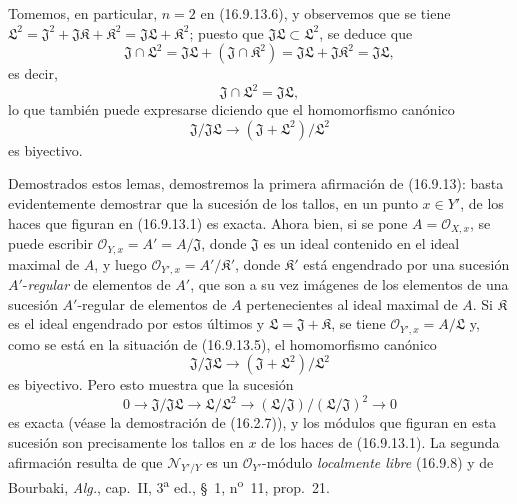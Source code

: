 Tomemos, en particular, $n=2$ en (16.9.13.6), y observemos que se tiene
$\mathfrak{L}^2=\mathfrak J^2+\mathfrak J\mathfrak{K}+\mathfrak{K}^2
=\mathfrak J\mathfrak{L}+\mathfrak{K}^2$; puesto que
$\mathfrak J\mathfrak{L}\subset\mathfrak{L}^2$, se deduce que
\[
  \mathfrak J\cap\mathfrak{L}^2
  =\mathfrak J\mathfrak{L}+(\mathfrak J\cap\mathfrak{K}^2)
  =\mathfrak J\mathfrak{L}+\mathfrak J\mathfrak{K}^2
  =\mathfrak J\mathfrak{L},
\]
es decir,
\[
  \mathfrak J\cap\mathfrak{L}^2=\mathfrak J\mathfrak{L},
  \tag{16.9.13.7}
  \label{IV.16.9.13.7}
\]
lo que también puede expresarse diciendo que el homomorfismo canónico
\[
  \mathfrak J/\mathfrak J\mathfrak{L}
  \longrightarrow(\mathfrak J+\mathfrak{L}^2)/\mathfrak{L}^2
\]
es biyectivo.

Demostrados estos lemas, demostremos la primera afirmación de (16.9.13): basta
evidentemente demostrar que la sucesión de los tallos, en un punto $x\in Y'$,
de los haces que figuran en (16.9.13.1) es exacta. Ahora bien, si se pone
$A=\mathcal{O}_{X,x}$, se puede escribir
$\mathcal{O}_{Y,x}=A'=A/\mathfrak J$, donde $\mathfrak J$ es un ideal
contenido en el ideal maximal de $A$, y luego
$\mathcal{O}_{Y',x}=A'/\mathfrak{K}'$, donde $\mathfrak{K}'$ está engendrado
por una sucesión $A'$-\emph{regular} de elementos de $A'$, que son a su vez imágenes
de los elementos de una sucesión $A'$-regular de elementos de $A$
pertenecientes al ideal maximal de $A$. Si $\mathfrak{K}$ es el ideal
engendrado por estos últimos y $\mathfrak{L}=\mathfrak J+\mathfrak{K}$, se
tiene $\mathcal{O}_{Y',x}=A/\mathfrak{L}$ y, como se está en la situación de
(16.9.13.5), el homomorfismo canónico
\[
  \mathfrak J/\mathfrak J\mathfrak{L}
  \longrightarrow(\mathfrak J+\mathfrak{L}^2)/\mathfrak{L}^2
\]
es biyectivo. Pero esto muestra que la sucesión
\[
  0\longrightarrow\mathfrak J/\mathfrak J\mathfrak{L}
  \longrightarrow\mathfrak{L}/\mathfrak{L}^2
  \longrightarrow(\mathfrak{L}/\mathfrak J)/
    (\mathfrak{L}/\mathfrak J)^2\longrightarrow0
\]
es exacta (véase la demostración de (16.2.7)), y los módulos que figuran en
esta sucesión son precisamente los tallos en $x$ de los haces de (16.9.13.1).
La segunda afirmación resulta de que $\mathcal{N}_{Y'/Y}$ es un
$\mathcal{O}_{Y'}$-módulo \emph{localmente libre} (16.9.8) y de Bourbaki,
\emph{Alg.}, cap.~II, 3\textsuperscript{a} ed., §~1, n\textsuperscript{o}~11,
prop.~21.
